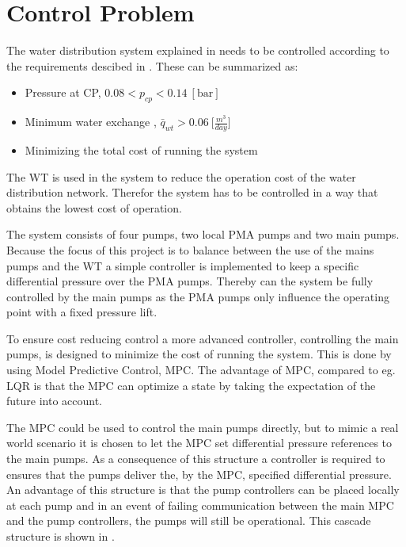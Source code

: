 \section{Control Problem}
\label{control_problem}

The water distribution system explained in  needs to be controlled according to the requirements descibed in . These can be summarized as: 

\begin{itemize}
	\item Pressure at CP, $0.08 < p_{cp} < 0.14 \:[\text{bar}]$
%
	\item Minimum water exchange , $\bar{q}_{wt} > 0.06 \: \big[\frac{m^3}{day}\big]$
%
	\item Minimizing the total cost of running the system
\end{itemize}

The WT is used in the system to reduce the operation cost of the water distribution network. Therefor the system has to be controlled in a way that obtains the lowest cost of operation. 

The system consists of four pumps, two local PMA pumps and two main pumps. Because the focus of this project is to balance between the use of the mains pumps and the WT a simple controller is implemented to keep a specific differential pressure over the PMA pumps. Thereby can the system be fully controlled by the main pumps as the PMA pumps only influence the operating point with a fixed pressure lift.

To ensure cost reducing control a more advanced controller, controlling the main pumps, is designed to minimize the cost of running the system. This is done by using Model Predictive Control, MPC. The advantage of MPC, compared to eg. LQR is that the MPC can optimize a state by taking the expectation of the future into account. 

The MPC could be used to control the main pumps directly, but to mimic a real world scenario it is chosen to let the MPC set differential pressure references to the main pumps. As a consequence of this structure a controller is required to ensures that the pumps deliver the, by the MPC, specified differential pressure. An advantage of this structure is that the pump controllers can be placed locally at each pump and in an event of failing communication between the main MPC and the pump controllers, the pumps will still be operational. 
This cascade structure is shown in .  


